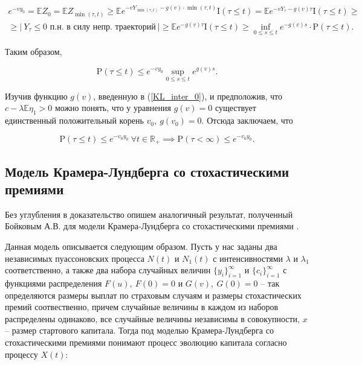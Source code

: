 \documentclass{article}
\theoremstyle{plain}
\theoremstyle{plain}
\theoremstyle{plain}
\theoremstyle{plain}
\theoremstyle{definition}
\theoremstyle{remark}
\begin{document}
\begin{equation}
\begin{aligned}
    e^{-v y_0} = \mathbb{E} Z_0 = \mathbb{E} Z_{\min (\tau, t)} \geq \mathbb{E} e^{-v Y_{\min (\tau, t)} - g(v) \cdot \min (\tau, t)} \mathrm{I} (\tau \leq t) = \mathbb{E} e^{-v Y_\tau - g(v) \tau} \mathrm{I} (\tau \leq t) \geq \\
    \geq |\ Y_\tau \leq 0 \text{ п.н. в силу непр. траекторий}\ | \geq \mathbb{E} e^{-g(v) \tau} \mathrm{I} (\tau \leq t) \geq \displaystyle \inf_{0 \leq s \leq t} e^{-g(v)s} \cdot \mathrm{P}(\tau \leq t).
\end{aligned}
\end{equation}

Таким образом,

\begin{equation}
    \mathrm{P} (\tau \leq t) \leq e^{-v y_0} \sup_{0 \leq s \leq t} e^{g(v)s}.
\end{equation}

Изучив функцию $g(v)$, введенную в (\ref{KL_inter_0}), и предположив, что $c - \lambda \mathbb{E} \eta_1 > 0$ можно понять, что у уравнения $g(v) = 0$ существует единственный положительный корень $v_0,\ g(v_0) = 0$. Отсюда заключаем, что

\begin{equation}
\label{KLDefaultUpperEstimation}
    \mathrm{P} (\tau \leq t) \leq e^{-v_0 y_0}\ \forall t \in \mathbb{R}_+ \implies \mathrm{P} (\tau < \infty) \leq e^{-v_0 y_0}.
\end{equation}

\subsection{Модель Крамера-Лундберга со стохастическими премиями}

Без углубления в доказательство опишем аналогичный результат, полученный Бойковым А.В. для модели Крамера-Лундберга со стохастическими премиями \cite{KL_premium}.

Данная модель описывается следующим образом. Пусть у нас заданы два независимых пуассоновских процесса $N(t)$ и $N_1(t)$ с интенсивностями $\lambda$ и $\lambda_1$ соответственно, а также два набора случайных величин $\{ y_i \}_{i = 1}^{\infty}$ и $\{ c_i \}_{i = 1}^{\infty}$ с функциями распределения $F(u),\ F(0) = 0$ и $G(v),\ G(0) = 0$ -- так определяются размеры выплат по страховым случаям и размеры стохастических премий соотвественно, причем случайные величины в каждом из наборов распределены одинаково, все случайные величины независимы в совокупности, $x$ -- размер стартового капитала. Тогда под моделью Крамера-Лундберга со стохастическими премиями понимают процесс эволюцию капитала согласно процессу $X(t)$:
\end{document}

